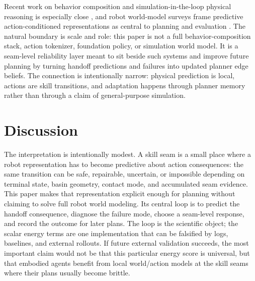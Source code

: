 \documentclass{article}
\begin{document}
Recent work on behavior composition and simulation-in-the-loop physical reasoning is especially close \citep{chen2026costream,liu2026simpact}, and robot world-model surveys frame predictive action-conditioned representations as central to planning and evaluation \citep{hou2026worldmodel}. The natural boundary is scale and role: this paper is not a full behavior-composition stack, action tokenizer, foundation policy, or simulation world model. It is a seam-level reliability layer meant to sit beside such systems and improve future planning by turning handoff predictions and failures into updated planner edge beliefs. The connection is intentionally narrow: physical prediction is local, actions are skill transitions, and adaptation happens through planner memory rather than through a claim of general-purpose simulation.
\section{Discussion}
The interpretation is intentionally modest. A skill seam is a small place where a robot representation has to become predictive about action consequences: the same transition can be safe, repairable, uncertain, or impossible depending on terminal state, basin geometry, contact mode, and accumulated seam evidence. This paper makes that representation explicit enough for planning without claiming to solve full robot world modeling. Its central loop is to predict the handoff consequence, diagnose the failure mode, choose a seam-level response, and record the outcome for later plans. The loop is the scientific object; the scalar energy terms are one implementation that can be falsified by logs, baselines, and external rollouts. If future external validation succeeds, the most important claim would not be that this particular energy score is universal, but that embodied agents benefit from local world/action models at the skill seams where their plans usually become brittle.
\end{document}
